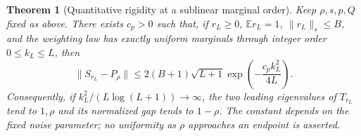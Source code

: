 \documentclass[11pt]{article}
\newtheorem{theorem}{Theorem}
\begin{document}
\begin{theorem}[Quantitative rigidity at a sublinear marginal order]
\label{thm:quadratic-marginal-rigidity}
Keep $\rho,s,p,Q$ fixed as above. There exists $c_p>0$ such that, if
$r_L\geq0$, $\mathbb E r_L=1$, $\|r_L\|_s\leq B$, and the weighting
law has exactly uniform marginals through integer order $0\leq k_L\leq L$,
then
\begin{equation}\label{eq:quadratic-marginal-rate}
 \|S_{r_L}-P_\rho\|
 \leq 2(B+1)\sqrt{L+1}\exp\!\left(-\frac{c_p k_L^2}{4L}\right).
\end{equation}
Consequently, if $k_L^2/(L\log(L+1))\to\infty$, the two leading
eigenvalues of $T_{r_L}$ tend to $1,\rho$ and its normalized gap tends
to $1-\rho$. The constant depends on the fixed noise parameter; no
uniformity as $\rho$ approaches an endpoint is asserted.
\end{theorem}
\end{document}
